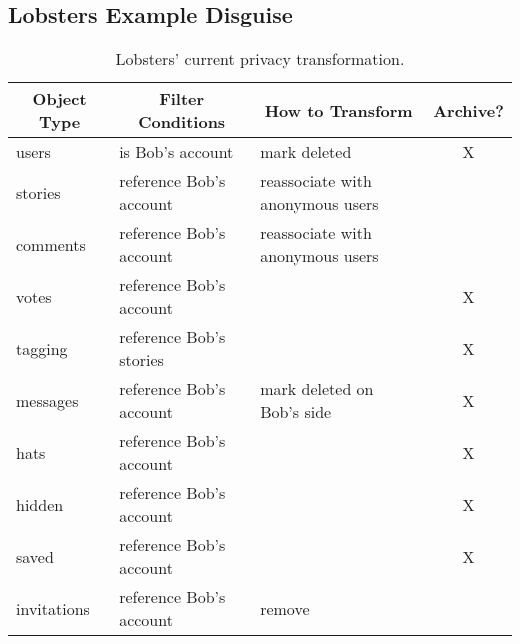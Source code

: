 \subsection{Lobsters Example Disguise}
\begin{table*}[t!]
\begin{tabular}{@{}l|l|l|c@{}}
    \multicolumn{1}{c}{\textbf{Object Type}} & 
    \multicolumn{1}{c}{\textbf{Filter Conditions}} &
    \multicolumn{1}{c}{\textbf{How to Transform}}  &
    \multicolumn{1}{c}{\textbf{Archive?}} \\ 
    \hline
    users & is Bob's account & mark deleted & X \\
    stories & reference Bob's account & reassociate with anonymous users & \\
    comments & reference Bob's account & reassociate with anonymous users & \\
    votes & reference Bob's account & & X \\
    tagging & reference Bob's stories & & X  \\
    messages & reference Bob's account & mark deleted on Bob's side & X \\
    hats & reference Bob's account & & X\\
    hidden & reference Bob's account & & X\\
    saved & reference Bob's account & & X\\
    invitations & reference Bob's account & remove & \\
\end{tabular}
    \caption{Lobsters' current privacy transformation.}
    \label{tab:lobsters_original}
\end{table*}


